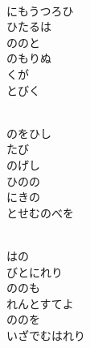 \documentclass[10pt,b5j]{tarticle} %
\begin{document}
\begin{enumerate}
\begin{minipage}[c]{\blocksize}
    \end{minipage}
    \begin{minipage}[c]{\blocksize}
        
        \vspace{\linespace}
        \item~\\
        にもうつろひ\\
        ひたるは\\
        ののと\\
        のもりぬ\\
        くが\\
        とびく
        
    \end{minipage}
    \begin{minipage}[c]{\blocksize}
        
        \vspace{\linespace}
        \item~\\
        のをひし\\
        たび\\
        のげし\\
        ひのの\\
        にきの\\
        とせむのべを
        
    \end{minipage}
    \begin{minipage}[c]{\blocksize}
        
        \vspace{\linespace}
        \item~\\
        はの\\
        びとにれり\\
        ののも\\
        れんとすてよ\\
        ののを\\
        いざでむはれり
        

\end{minipage}
\end{enumerate}
\end{document}
